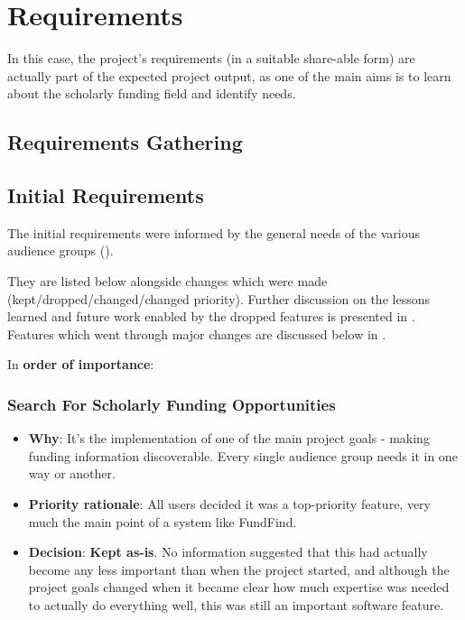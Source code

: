 \section{Requirements}
\label{devprocess-requirements}


In this case, the project's requirements (in a suitable share-able form) are actually part of the expected project output, as one of the main aims is to learn about the scholarly funding field and identify needs.

\subsection{Requirements Gathering}



\subsection{Initial Requirements}
\label{initial-reqs}
The initial requirements were informed by the general needs of the various audience groups ().

They are listed below alongside changes which were made (kept/dropped/changed/changed priority). Further discussion on the lessons learned and future work enabled by the dropped features is presented in . Features which went through major changes are discussed below in .

In \textbf{order of importance}:
\subsubsection{Search For Scholarly Funding Opportunities}
\begin{itemize}
 \item \textbf{Why}: It's the implementation of one of the main project goals - making funding information discoverable. Every single audience group needs it in one way or another.
 \item \textbf{Priority rationale}: All users decided it was a top-priority feature, very much the main point of a system like FundFind.
 \item \textbf{Decision}: \textbf{Kept as-is}. No information suggested that this had actually become any less important than when the project started, and although the project goals changed when it became clear how much expertise was needed to actually do everything well, this was still an important software feature.
\end{itemize}

